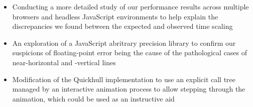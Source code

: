 \documentclass[11pt]{article}
\begin{document}
\begin{itemize}
\item
Conducting a more detailed study of our performance results across multiple browsers and headless JavaScript environments to help explain the discrepancies we found between the expected and observed time scaling
\item
An exploration of a JavaScript abritrary precision library to confirm our suspicions of floating-point error being the cause of the pathological cases of near-horizontal and -vertical lines
\item
Modification of the Quickhull implementation to use an explicit call tree managed by an interactive animation process to allow stepping through the animation, which could be used as an instructive aid
\end{itemize}

\nocite{Princeton:QH}



\end{document}
